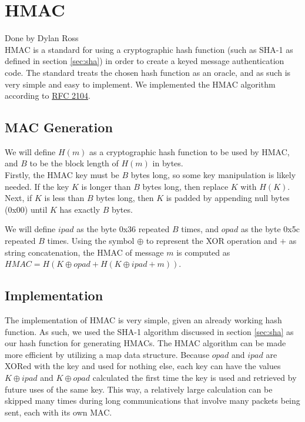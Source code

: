 \section{HMAC}\label{sec:hmac}
Done by Dylan Ross\\

	\medskip
	HMAC is a standard for using a cryptographic hash function (such as SHA-1 as defined in section \ref{sec:sha}) in order to create a keyed message authentication code. The standard treats the
	chosen hash function as an oracle, and as such is very simple and easy to implement. We implemented the HMAC algorithm according to \href{https://tools.ietf.org/html/rfc2104}{RFC 2104}.

	\subsection{MAC Generation}\label{sec:hmac-generation}
		We will define $H(m)$ as a cryptographic hash function to be used by HMAC, and $B$ to be the block length of $H(m)$ in bytes.\\

		Firstly, the HMAC key must be $B$ bytes long, so some key manipulation is likely needed. If the key $K$ is longer than $B$ bytes long, then replace $K$ with $H(K)$. Next, if $K$ is less
		than $B$ bytes long, then $K$ is padded by appending null bytes (0x00) until $K$ has exactly $B$ bytes.

		We will define $ipad$ as the byte 0x36 repeated $B$ times, and $opad$ as the byte 0x5c repeated $B$ times. Using the symbol $\oplus$ to represent the XOR operation and $+$ as string
		concatenation, the HMAC of message $m$ is computed as $HMAC=H(K\oplus opad + H(K\oplus ipad + m))$.

	\subsection{Implementation}\label{sec:hmac-implementation}
		The implementation of HMAC is very simple, given an already working hash function. As such, we used the SHA-1 algorithm discussed in section \ref{sec:sha} as our hash function for
		generating HMACs. The HMAC algorithm can be made more efficient by utilizing a map data structure. Because $opad$ and $ipad$ are XORed with the key and used for nothing else, each
		key can have the values $K\oplus ipad$ and $K\oplus opad$ calculated the first time the key is used and retrieved by future uses of the same key. This way, a relatively large calculation
		can be skipped many times during long communications that involve many packets being sent, each with its own MAC.
